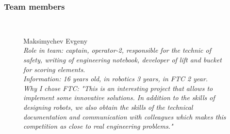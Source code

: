 \subsubsection{Team members}
\begin{figure}[H]
	\begin{minipage}[h]{0.47\linewidth}
		\\		
	\end{minipage}
	\hfill
	\begin{minipage}[h]{0.47\linewidth}
		Maksimychev Evgeny\\
		\emph{Role in team: captain, operator-2, responsible for the technic of safety,  writing of engineering notebook, developer of lift and bucket for scoring elements. \\}
		\emph{Information: 16 years old, in robotics 3 years, in FTC 2 year. \\}
		\emph{Why I chose FTC: "This is an interesting project that allows to implement some innovative solutions. In addition to the skills of designing robots, we also obtain the skills of the technical documentation and communication with colleagues which makes this competition as close to real engineering problems."}	
	\end{minipage}
\end{figure}

